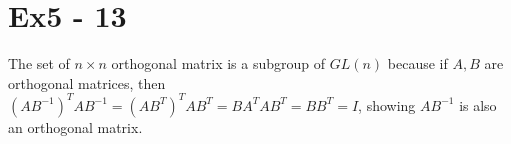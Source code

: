 \section*{Ex5 - 13}
The set of $ n \times n $ orthogonal matrix is a subgroup of $ GL(n) $ because if $ A, B $ are orthogonal matrices, then $ (AB^{-1})^TAB^{-1} = (AB^T)^TAB^T = BA^TAB^T = BB^T = I $, showing $ AB^{-1} $ is also an orthogonal matrix.

